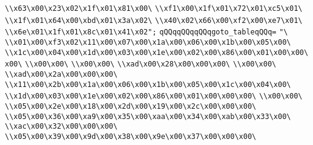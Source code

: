 \verb|\\x63\x00\x23\x02\x1f\x01\x81\x00\|\newline
\verb|\\xf1\x00\x1f\x01\x72\x01\xc5\x01\|\newline
\verb|\\x1f\x01\x64\x00\xbd\x01\x3a\x02\|\newline
\verb|\\x40\x02\x66\x00\xf2\x00\xe7\x01\|\newline
\verb|\\x6e\x01\x1f\x01\x8c\x01\x41\x02";|\newline
\verb|qQQqqQQqqQQqgoto_tableqQQq=|\newline
\verb|"\|\newline
\verb|\\x01\x00\xf3\x02\x11\x00\x07\x00\x1a\x00\x06\x00\x1b\x00\x05\x00\|\newline
\verb|\\x1c\x00\x04\x00\x1d\x00\x03\x00\x1e\x00\x02\x00\x86\x00\x01\x00\x00\x00\|\newline
\verb|\\x00\x00\|\newline
\verb|\\x00\x00\|\newline
\verb|\\xad\x00\x28\x00\x00\x00\|\newline
\verb|\\x00\x00\|\newline
\verb|\\xad\x00\x2a\x00\x00\x00\|\newline
\verb|\\x11\x00\x2b\x00\x1a\x00\x06\x00\x1b\x00\x05\x00\x1c\x00\x04\x00\|\newline
\verb|\\x1d\x00\x03\x00\x1e\x00\x02\x00\x86\x00\x01\x00\x00\x00\|\newline
\verb|\\x00\x00\|\newline
\verb|\\x05\x00\x2e\x00\x18\x00\x2d\x00\x19\x00\x2c\x00\x00\x00\|\newline
\verb|\\x05\x00\x36\x00\xa9\x00\x35\x00\xaa\x00\x34\x00\xab\x00\x33\x00\|\newline
\verb|\\xac\x00\x32\x00\x00\x00\|\newline
\verb|\\x05\x00\x39\x00\x9d\x00\x38\x00\x9e\x00\x37\x00\x00\x00\|\newline
